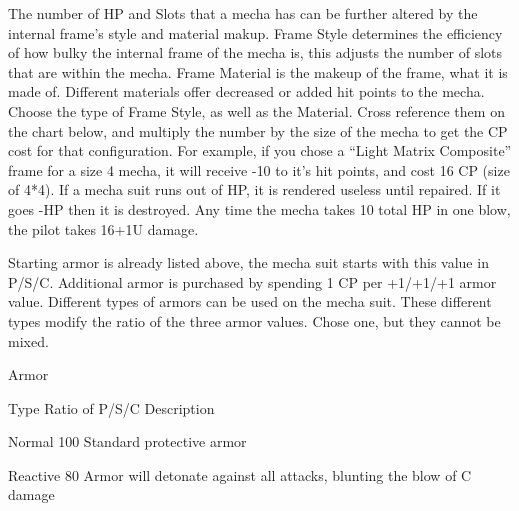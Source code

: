 \documentclass[twoside]{book}
\begin{document}
                    The number of HP and Slots that a mecha has can
                   be further altered by the internal frame’s style
                   and material makup. Frame Style determines the
                   efficiency of how bulky the internal frame of the
                   mecha is, this adjusts the number of slots that are
                   within the mecha. Frame Material is the makeup of the
                   frame, what it is made of. Different materials offer
                   decreased or added hit points to the mecha. Choose the
                   type of Frame Style, as well as the Material. Cross
                   reference them on the chart below, and multiply the
                   number by the size of the mecha to get the CP cost for
                   that configuration. 
                    For example, if you chose a “Light Matrix
                   Composite” frame for a size 4 mecha, it will
                   receive -10%
                   to it’s hit points, and cost 16 CP (size of
                   4*4). 
                    If a mecha suit runs out of HP, it is rendered
                   useless until repaired. If it goes -HP then it is
                   destroyed. Any time the mecha takes 10%
                   total HP in one blow, the pilot takes 16+1U damage.
                   
                
                  Starting armor is already listed above, the mecha
                 suit starts with this value in P/S/C. Additional armor
                 is purchased by spending 1 CP per +1/+1/+1 armor value.
                 Different types of armors can be used on the mecha suit.
                 These different types modify the ratio of the three
                 armor values. Chose one, but they cannot be mixed.
                 
                
                Armor  
                  
                    
                      
                       Type   
                       Ratio of P/S/C   
                       Description   
                      
                      
                       Normal   
                       100%
                       Standard protective armor   
                      
                      
                       Reactive   
                       80%
                         Armor will detonate against all attacks,
                         blunting the blow of C damage 
                      
\end{document}
